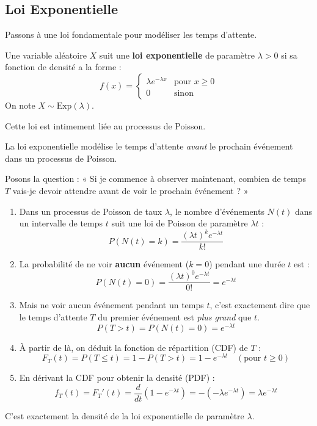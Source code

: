 \subsection{Loi Exponentielle}

Passons à une loi fondamentale pour modéliser les temps d'attente.

\begin{definitionbox}
Une variable aléatoire $X$ suit une \textbf{loi exponentielle} de paramètre $\lambda > 0$ si sa fonction de densité a la forme :
$$ f(x) = \begin{cases} \lambda e^{-\lambda x} & \text{pour } x \ge 0 \\ 0 & \text{sinon} \end{cases} $$
On note $X \sim \text{Exp}(\lambda)$.
\end{definitionbox}

Cette loi est intimement liée au processus de Poisson.

\begin{intuitionbox}
La loi exponentielle modélise le temps d'attente \textit{avant} le prochain événement dans un processus de Poisson.

Posons la question : « Si je commence à observer maintenant, combien de temps $T$ vais-je devoir attendre avant de voir le prochain événement ? »
\begin{enumerate}
    \item Dans un processus de Poisson de taux $\lambda$, le nombre d'événements $N(t)$ dans un intervalle de temps $t$ suit une loi de Poisson de paramètre $\lambda t$ :
    $$ P(N(t)=k) = \frac{(\lambda t)^k e^{-\lambda t}}{k!} $$
    \item La probabilité de ne voir \textbf{aucun} événement ($k=0$) pendant une durée $t$ est :
    $$ P(N(t)=0) = \frac{(\lambda t)^0 e^{-\lambda t}}{0!} = e^{-\lambda t} $$
    \item Mais ne voir aucun événement pendant un temps $t$, c'est exactement dire que le temps d'attente $T$ du premier événement est \textit{plus grand} que $t$.
    $$ P(T > t) = P(N(t)=0) = e^{-\lambda t} $$
    \item À partir de là, on déduit la fonction de répartition (CDF) de $T$ :
    $$ F_T(t) = P(T \le t) = 1 - P(T > t) = 1 - e^{-\lambda t} \quad (\text{pour } t \ge 0) $$
    \item En dérivant la CDF pour obtenir la densité (PDF) :
    $$ f_T(t) = F_T'(t) = \frac{d}{dt}(1 - e^{-\lambda t}) = -(-\lambda e^{-\lambda t}) = \lambda e^{-\lambda t} $$
\end{enumerate}
C'est exactement la densité de la loi exponentielle de paramètre $\lambda$.
\end{intuitionbox}

